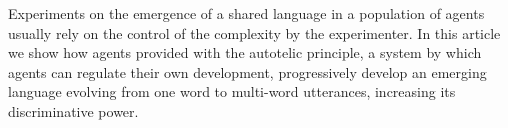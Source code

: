 Experiments on the emergence of a shared language in a population of agents usually rely on the control of the complexity by the experimenter. In this article we show how agents provided with the autotelic principle, a system by which agents can regulate their own development, progressively develop an emerging language evolving from one word to multi-word utterances, increasing its discriminative power.
